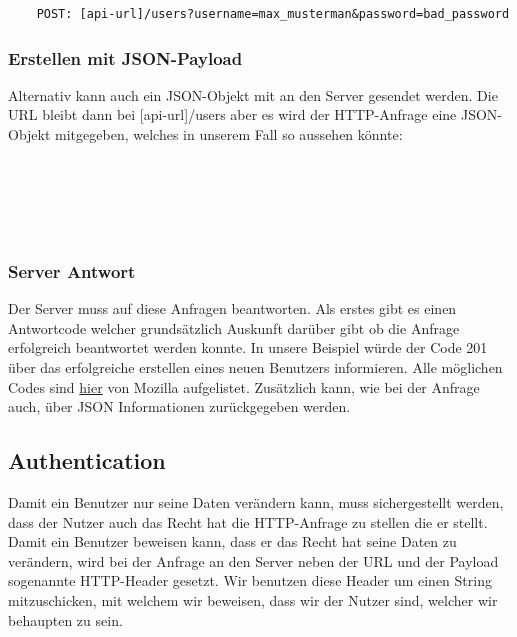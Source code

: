 \documentclass{article}
\begin{document}
\begin{verbatim}
    POST: [api-url]/users?username=max_musterman&password=bad_password
\end{verbatim}

\subsubsection{Erstellen mit JSON-Payload}
Alternativ kann auch ein JSON-Objekt mit an den Server gesendet werden. Die URL bleibt dann
bei [api-url]/users aber es wird der HTTP-Anfrage eine JSON-Objekt mitgegeben, welches in unserem Fall
so aussehen könnte:

\noindent
\ttfamily
\hldef{}\hlkwa{\{}\hspace*{\fill}\\
\hldef{}\hldef{\ \ \ \ }\hldef{}\hldef{}\hlopt{:\ }\hldef{}\hldef{}\hlopt{,}\hspace*{\fill}\\
\hldef{}\hldef{\ \ \ \ }\hldef{}\hldef{}\hlopt{:\ }\hldef{}\hldef{}\hspace*{\fill}\\
\hldef{}\hlkwa{\}}\hldef{}\hspace*{\fill}\\
\mbox{}
\normalfont
\normalsize
{}

\subsubsection{Server Antwort}

Der Server muss auf diese Anfragen beantworten. Als erstes gibt es einen Antwortcode
welcher grundsätzlich Auskunft darüber gibt ob  die Anfrage erfolgreich beantwortet werden
konnte. In unsere Beispiel würde der Code 201 über das erfolgreiche erstellen eines neuen Benutzers
informieren. Alle möglichen Codes sind \href{https://developer.mozilla.org/en-US/docs/Web/HTTP/Status}{hier} von Mozilla
aufgelistet. Zusätzlich kann, wie bei der Anfrage auch, über JSON Informationen zurückgegeben
werden.

\subsection{Authentication}
Damit ein Benutzer nur seine Daten verändern kann, muss sichergestellt werden, dass der Nutzer auch das Recht hat
die HTTP-Anfrage zu stellen die er stellt. Damit ein Benutzer beweisen kann, dass er das Recht hat seine Daten zu verändern,
wird bei der Anfrage an den Server neben der URL und der Payload sogenannte HTTP-Header gesetzt.
Wir benutzen diese Header um einen String mitzuschicken, mit welchem wir beweisen, dass wir der Nutzer sind, 
welcher wir behaupten zu sein.
\end{document}
